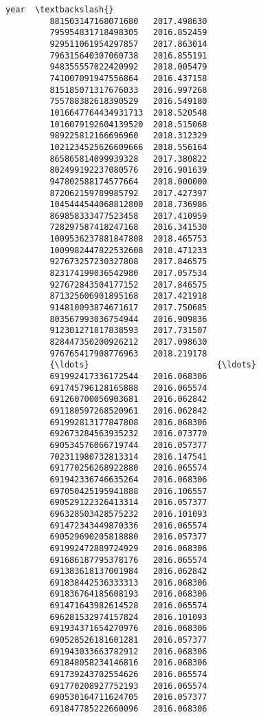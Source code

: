 \documentclass[11pt]{article}
\begin{document}
\begin{Verbatim}[commandchars=\\\{\}]
                                     year  \textbackslash{}
         881503147168071680   2017.498630   
         795954831718498305   2016.852459   
         929511061954297857   2017.863014   
         796315640307060738   2016.855191   
         948355557022420992   2018.005479   
         741007091947556864   2016.437158   
         815185071317676033   2016.997268   
         755788382618390529   2016.549180   
         1016647764434931713  2018.520548   
         1016079192604139520  2018.515068   
         989225812166696960   2018.312329   
         1021234525626609666  2018.556164   
         865865814099939328   2017.380822   
         802499192237080576   2016.901639   
         947802588174577664   2018.000000   
         872062159789985792   2017.427397   
         1045444544068812800  2018.736986   
         869858333477523458   2017.410959   
         728297587418247168   2016.341530   
         1009536237881847808  2018.465753   
         1009982447822532608  2018.471233   
         927673257230327808   2017.846575   
         823174199036542980   2017.057534   
         927672843504177152   2017.846575   
         871325606901895168   2017.421918   
         914810093874671617   2017.750685   
         803567993036754944   2016.909836   
         912301271817838593   2017.731507   
         828447350200926212   2017.098630   
         976765417908776963   2018.219178   
         {\ldots}                          {\ldots}   
         691992417336172544   2016.068306   
         691745796128165888   2016.065574   
         691260700056903681   2016.062842   
         691180597268520961   2016.062842   
         691992813177847808   2016.068306   
         692673284563935232   2016.073770   
         690534576066719744   2016.057377   
         702311980732813314   2016.147541   
         691770256268922880   2016.065574   
         691942336746635264   2016.068306   
         697050425195941888   2016.106557   
         690529122326413314   2016.057377   
         696328503428575232   2016.101093   
         691472343449870336   2016.065574   
         690529690205818880   2016.057377   
         691992472889724929   2016.068306   
         691686187795378176   2016.065574   
         691383618137001984   2016.062842   
         691838442536333313   2016.068306   
         691836764185608193   2016.068306   
         691471643982614528   2016.065574   
         696281532974157824   2016.101093   
         691934371654270976   2016.068306   
         690528526181601281   2016.057377   
         691943033663782912   2016.068306   
         691848058234146816   2016.068306   
         691739243702554626   2016.065574   
         691770208927752193   2016.065574   
         690530164711624705   2016.057377   
         691847785222660096   2016.068306   
         

\end{Verbatim}
\end{document}
